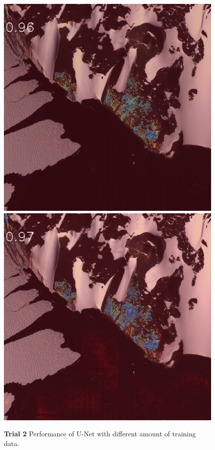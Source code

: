 \begin{figure}[h]
\includegraphics[width=\subFigx]{./fig/datagrow/MSE_single_unet_train_1_3.txt_bias-1_bs128_do0.1e25/4.png}
\includegraphics[width=\subFigx]{./fig/datagrow/MSE_single_unet_train_1_4.txt_bias-1_bs128_do0.1e25/4.png}


\caption{{{\bf Trial 2} Performance of U-Net with different amount of training data.}}
\label{fig:dgrow2}
\end{figure}

